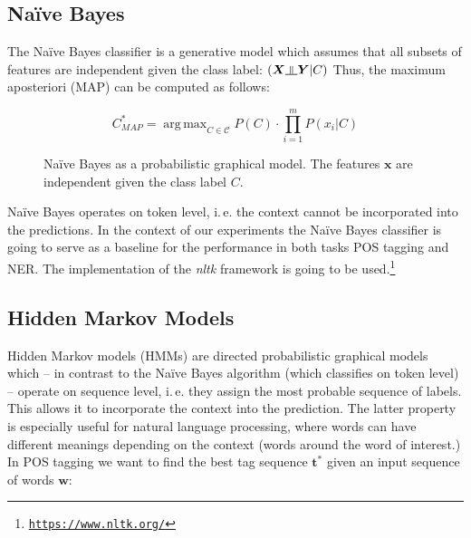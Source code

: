 \documentclass[twocolumns]{IEEEtran}
\DeclareMathOperator*{\argmax}{arg\,max}
\newcommand{\indep}{\rotatebox[origin=c]{90}{$\models$}}
\begin{document}
\subsection{Na\"ive Bayes}
The Na\"ive Bayes classifier is a generative model which assumes that all subsets of features are independent given the class label: $(\bm{X} \indep \bm{Y} \vert C)$ Thus, the maximum aposteriori (MAP) can be computed as follows:

\begin{equation*}
    C_{MAP}^* = \argmax_{C \in \mathcal{C}} P(C) \cdot \prod_{i=1}^m P(x_i \vert C)
\end{equation*}

\begin{figure}[h]
	\centering
	\caption{Na\"ive Bayes as a probabilistic graphical model. The features $\bm{x}$ are independent given the class label $C$.}
\end{figure}

Na\"ive Bayes operates on token level, i.\,e. the context cannot be incorporated into the predictions. In the context of our experiments the Na\"ive Bayes classifier is going to serve as a baseline for the performance in both tasks POS tagging and NER. The implementation of the \textit{nltk} framework is going to be used.\footnote{\texttt{\url{https://www.nltk.org/}}}

\subsection{Hidden Markov Models}
Hidden Markov models (HMMs) are directed probabilistic graphical models which -- in contrast to the Na\"ive Bayes algorithm (which classifies on token level) -- operate on sequence level, i.\,e. they assign the most probable sequence of labels. This allows it to incorporate the context into the prediction. The latter property is especially useful for natural language processing, where words can have different meanings depending on the context (words around the word of interest.) In POS tagging we want to find the best tag sequence $\bm{t}^*$ given an input sequence of words $\bm{w}$:
\end{document}
